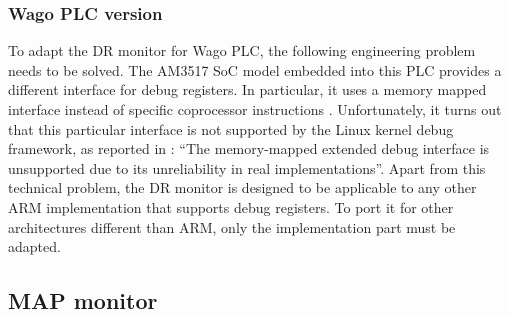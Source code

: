 \subsubsection{Wago PLC version}

To adapt the DR monitor for Wago PLC, the following engineering problem needs to be solved.
The AM3517 SoC model embedded into this PLC provides a different interface for debug registers. In particular, it uses a memory mapped interface
instead of specific coprocessor instructions \cite{am35x}.
Unfortunately, it turns out that this particular interface is not supported by the Linux kernel debug framework, as reported in \cite{dr-mapped}:
``The memory-mapped extended debug interface is unsupported due to its unreliability in real implementations''.
Apart from this technical problem, the DR monitor is designed to be applicable to any other ARM implementation that supports debug registers.
To port it for other architectures different than ARM, only the implementation part must be adapted.


\subsection{MAP monitor}
\label{sec:map-impl}


